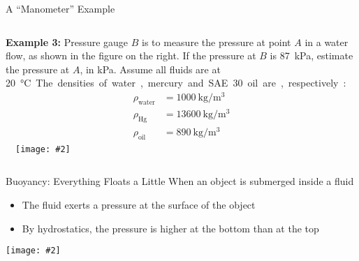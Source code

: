 \documentclass[12pt,aspectratio=169]{beamer}
\newcommand{\pic}[2]{\texttt{[image: \#2]}}
\begin{document}
\begin{frame}{A ``Manometer'' Example}
  \begin{columns}
    \textbf{Example 3:} Pressure gauge $B$ is to measure the pressure at point
    $A$ in a water flow, as shown in the figure on the right. If the pressure at
    $B$ is \SI{87}{\kilo\pascal}, estimate the pressure at $A$, in
    \si{\kilo\pascal}. Assume all fluids are at \SI{20}\celsius. The densities
    of water, mercury and SAE 30 oil are, respectively:

    \vspace{-.3in}
    \begin{align*}
      \rho_\text{water}&=\SI{1000}{\kilo\gram\per\metre^3}\\
      \rho_\text{Hg}&=\SI{13600}{\kilo\gram\per\metre^3}\\
      \rho_\text{oil}&=\SI{890}{\kilo\gram\per\metre^3}
    \end{align*}
    
    \pic{1}{mano.png}
  \end{columns}
\end{frame}



%
%    



\begin{frame}{Buoyancy: Everything Floats a Little}
  When an object is submerged inside a fluid
  \begin{itemize}
  \item The fluid exerts a pressure at the surface of the object
  \item By hydrostatics, the pressure is higher at the bottom than at the top
  \end{itemize}
  \begin{center}
    \pic{.3}{rock_fbvectors.png}
  \end{center}
\end{frame}
\end{document}
